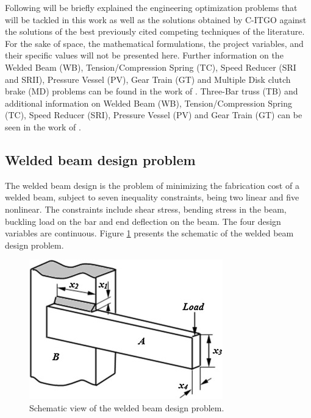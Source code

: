 Following will be briefly explained the engineering optimization problems that will be tackled in this work as well as the solutions obtained by C-ITGO against the solutions of the best previously cited competing techniques of the literature. For the sake of space, the mathematical formulations, the project variables, and their specific values will not be presented here. Further information on the Welded Beam (WB), Tension/Compression Spring (TC), Speed Reducer (SRI and SRII), Pressure Vessel (PV), Gear Train (GT) and Multiple Disk clutch brake (MD) problems can be found in the work of \cite{IAPSO}. Three-Bar truss (TB) and additional information on Welded Beam (WB), Tension/Compression Spring (TC), Speed Reducer (SRI), Pressure Vessel (PV) and Gear Train (GT) can be seen in the work of \cite{MBA}.



\subsection{Welded beam design problem}

The welded beam design \citep{WB} is the problem of minimizing the fabrication cost of a welded beam, subject to seven inequality constraints, being two linear and five nonlinear. The constraints include shear stress, bending stress in the beam, buckling load on the bar and end deflection on the beam. The four design variables are continuous. Figure \ref{fig:WB} presents the schematic of the welded beam design problem.

\begin{figure}[h]
\begin{center}
\includegraphics[scale=0.7]{Imgs/WB.jpg}
\end{center}
\captionsetup{justification=centering}
\caption{Schematic view of the welded beam design problem.}\label{fig:WB}
\end{figure}

